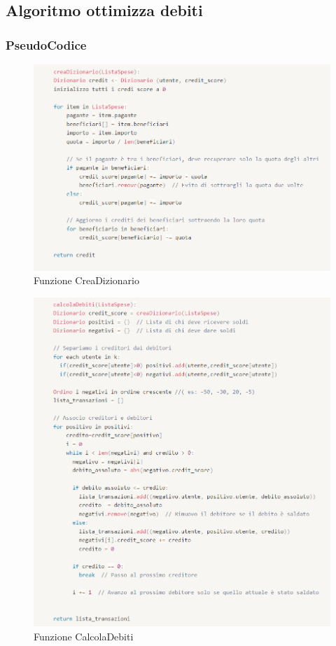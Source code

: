 \subsection{Algoritmo ottimizza debiti}

\subsubsection{PseudoCodice}
\begin{figure}[H]
    \centering
    \includegraphics[scale=0.8]{images/CreaDizionario.png}
    \caption{Funzione CreaDizionario}
\end{figure}

\begin{figure}[H]
    \centering
    \includegraphics[scale=0.8]{images/CalcolaDebiti.png}
    \caption{Funzione CalcolaDebiti}
\end{figure}


